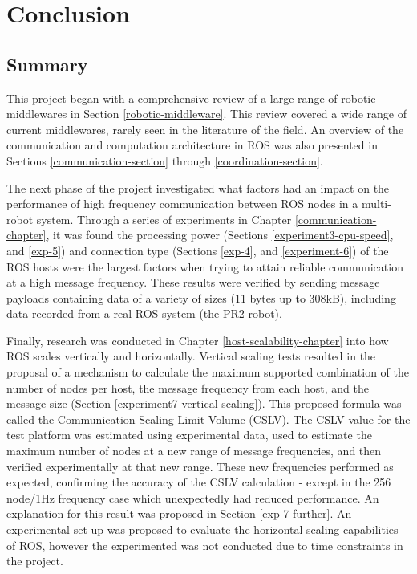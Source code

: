 \documentclass[../dissertation.tex]{subfiles}
\begin{document}
\chapter{Conclusion}
\label{conclusion-chapter}

\section{Summary}

This project began with a comprehensive review of a large range of robotic middlewares in Section \ref{robotic-middleware}. This review covered a wide range of current middlewares, rarely seen in the literature of the field. An overview of the communication and computation architecture in ROS was also presented in Sections \ref{communication-section} through \ref{coordination-section}.

The next phase of the project investigated what factors had an impact on the performance of high frequency communication between ROS nodes in a multi-robot system. Through a series of experiments in Chapter \ref{communication-chapter}, it was found the processing power (Sections \ref{experiment3-cpu-speed}, and \ref{exp-5}) and connection type (Sections \ref{exp-4}, and \ref{experiment-6}) of the ROS hosts were the largest factors when trying to attain reliable communication at a high message frequency. These results were verified by sending message payloads containing data of a variety of sizes (11 bytes up to 308kB), including data recorded from a real ROS system (the PR2 robot).

Finally, research was conducted in Chapter \ref{host-scalability-chapter} into how ROS scales vertically and horizontally. Vertical scaling tests resulted in the proposal of a mechanism to calculate the maximum supported combination of the number of nodes per host, the message frequency from each host, and the message size (Section \ref{experiment7-vertical-scaling}). This proposed formula was called the Communication Scaling Limit Volume (CSLV). The CSLV value for the test platform was estimated using experimental data, used to estimate the maximum number of nodes at a new range of message frequencies, and then verified experimentally at that new range. These new frequencies performed as expected, confirming the accuracy of the CSLV calculation - except in the 256 node/1Hz frequency case which unexpectedly had reduced performance. An explanation for this result was proposed in Section \ref{exp-7-further}. An experimental set-up was proposed to evaluate the horizontal scaling capabilities of ROS, however the experimented was not conducted due to time constraints in the project.
\end{document}
